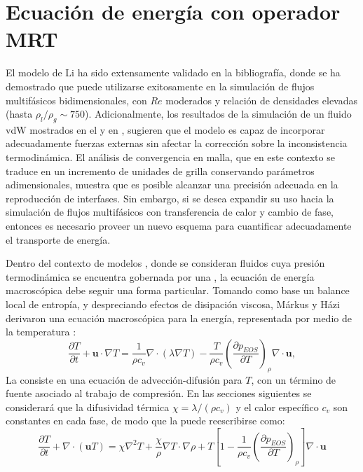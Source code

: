 \section{Ecuaci\'on de energ\'ia con operador MRT}
El modelo \pp{} de Li ha sido extensamente validado en la bibliograf\'ia, donde se ha demostrado que puede utilizarse exitosamente en la simulaci\'on de flujos multif\'asicos bidimensionales, con $Re$ moderados y relaci\'on de densidades elevadas (hasta $\rho_l / \rho_g \sim 750$). Adicionalmente, los resultados de la simulaci\'on de un fluido vdW mostrados en el  y en \cite{fogliatto_simulation_2019}, sugieren que el modelo es capaz de incorporar adecuadamente fuerzas externas sin afectar la correcci\'on sobre la inconsistencia termodin\'amica. El an\'alisis de convergencia en malla, que en este contexto se traduce en un incremento de unidades de grilla conservando par\'ametros adimensionales, muestra que es posible alcanzar una precisi\'on adecuada en la reproducci\'on de interfases. Sin embargo, si se desea expandir su uso hacia la simulaci\'on de flujos multif\'asicos con transferencia de calor y cambio de fase, entonces es necesario proveer un nuevo esquema para cuantificar adecuadamente el transporte de energ\'ia.

Dentro del contexto de modelos \pp{}, donde se consideran fluidos cuya presi\'on termodin\'amica se encuentra gobernada por una \eos{}, la ecuaci\'on de energ\'ia macrosc\'opica debe seguir una forma particular. Tomando como base un balance local de entrop\'ia, y despreciando efectos de disipaci\'on viscosa, M\'arkus y H\'azi derivaron una ecuaci\'on macrosc\'opica para la energ\'ia, representada por medio de la temperatura \cite{markus_simulation_2011}:
\begin{equation}
	\dfrac{\partial T}{\partial t} + \bm{u} \cdot \nabla T = \dfrac{1}{\rho c_v} \nabla \cdot(\lambda \nabla T) - \dfrac{T}{\rho c_v} \left( \dfrac{\partial p_{EOS}}{\partial T} \right)_{\rho} \nabla \cdot \bm{u},
	\label{eq:markus_orig}
\end{equation}
La  consiste en una ecuaci\'on de advecci\'on-difusi\'on para $T$, con un t\'ermino de fuente asociado al trabajo de compresi\'on. En las secciones siguientes se considerar\'a que la difusividad t\'ermica $\chi = \lambda/(\rho c_v)$ y el calor espec\'ifico $c_v$ son constantes en cada fase, de modo que la  puede reescribirse como:
\begin{equation}
	\dfrac{\partial T}{\partial t} + \nabla \cdot (\bm{u} T) = \chi \nabla^2 T  + \dfrac{\chi}{\rho} \nabla T \cdot \nabla \rho + T \left[ 1 - \dfrac{1}{\rho c_v} \left( \dfrac{\partial p_{EOS}}{\partial T} \right)_{\rho} \right] \nabla \cdot \bm{u}
	\label{eq:markus}
\end{equation}

